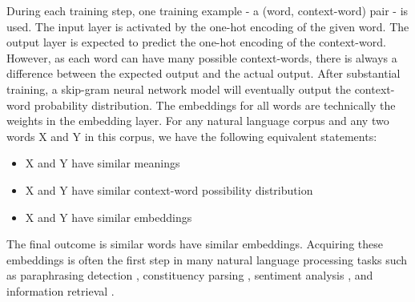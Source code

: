 \documentclass[conference]{IEEEtran}
\begin{document}
During each training step, one training example - a (word, context-word) pair - is used.
The input layer is activated by the one-hot encoding of the given word.
The output layer is expected to predict the one-hot encoding of the context-word.
However, as each word can have many possible context-words, there is always a difference between the expected output and the actual output.
After substantial training, a skip-gram neural network model will eventually output the context-word probability distribution.
The embeddings for all words are technically the weights in the embedding layer.
For any natural language corpus and any two words X and Y in this corpus, we have the following equivalent statements:
\begin{itemize}
	\item X and Y have similar meanings
	\item X and Y have similar context-word possibility distribution 
	\item X and Y have similar embeddings
\end{itemize}
The final outcome is similar words have similar embeddings.
Acquiring these embeddings is often the first step in many natural language processing tasks such as paraphrasing detection \cite{socher2012deep}, constituency parsing \cite{socher2013parsing},
sentiment analysis \cite{socher2013recursive}, and
information retrieval \cite{shen2014latent}.
\end{document}
